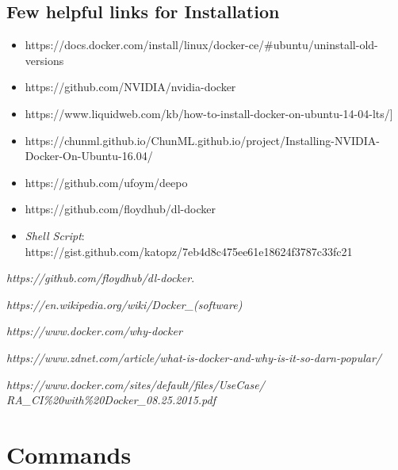 \documentclass[a4paper]{article}
\begin{document}
\subsection{Few helpful links for Installation}
\begin{itemize}
	\item {https://docs.docker.com/install/linux/docker-ce/\#ubuntu/uninstall-old-versions}
	\item {https://github.com/NVIDIA/nvidia-docker}
	\item {https://www.liquidweb.com/kb/how-to-install-docker-on-ubuntu-14-04-lts/]}
	\item {https://chunml.github.io/ChunML.github.io/project/Installing-NVIDIA-Docker-On-Ubuntu-16.04/}
	\item {https://github.com/ufoym/deepo}
	\item {https://github.com/floydhub/dl-docker}
	\item {\textit{Shell Script}: https://gist.github.com/katopz/7eb4d8c475ee61e18624f3787c33fc21}
\end{itemize}



\begin{thebibliography}{9}
	\textit{https://github.com/floydhub/dl-docker}. 
	
	\textit{https://en.wikipedia.org/wiki/Docker\_(software)}
	
	\textit{https://www.docker.com/why-docker}
	
	
	\textit{https://www.zdnet.com/article/what-is-docker-and-why-is-it-so-darn-popular/}
	
	\textit{https://www.docker.com/sites/default/files/UseCase/\\RA\_CI\%20with\%20Docker\_08.25.2015.pdf}
\end{thebibliography}


\section{Commands}
\end{document}
